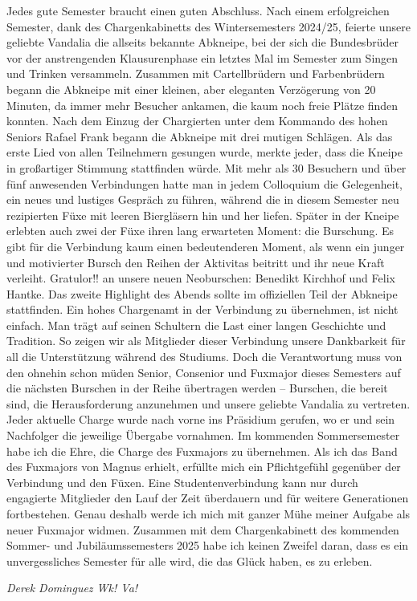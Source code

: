 \begin{multicols}{2}
Jedes gute Semester braucht einen guten Abschluss.
Nach einem erfolgreichen Semester, dank des Chargenkabinetts des Wintersemesters 2024/25, feierte unsere geliebte Vandalia die allseits bekannte Abkneipe,
bei der sich die Bundesbrüder vor der anstrengenden Klausurenphase ein letztes Mal im Semester zum Singen und Trinken versammeln.
Zusammen mit Cartellbrüdern und Farbenbrüdern begann die Abkneipe mit einer kleinen, aber eleganten Verzögerung von 20 Minuten, da immer mehr Besucher ankamen,
die kaum noch freie Plätze finden konnten.
Nach dem Einzug der Chargierten unter dem Kommando des hohen Seniors Rafael Frank begann die Abkneipe mit drei mutigen Schlägen.
Als das erste Lied von allen Teilnehmern gesungen wurde, merkte jeder, dass die Kneipe in großartiger Stimmung stattfinden würde.
Mit mehr als 30 Besuchern und über fünf anwesenden Verbindungen hatte man in jedem Colloquium die Gelegenheit, ein neues und lustiges Gespräch zu führen,
während die in diesem Semester neu rezipierten Füxe mit leeren Biergläsern hin und her liefen.
Später in der Kneipe erlebten auch zwei der Füxe ihren lang erwarteten Moment: die Burschung.
Es gibt für die Verbindung kaum einen bedeutenderen Moment, als wenn ein junger und motivierter Bursch den Reihen der Aktivitas beitritt und ihr neue Kraft verleiht.
Gratulor!! an unsere neuen Neoburschen: Benedikt Kirchhof und Felix Hantke.
Das zweite Highlight des Abends sollte im offiziellen Teil der Abkneipe stattfinden.
Ein hohes Chargenamt in der Verbindung zu übernehmen, ist nicht einfach.
Man trägt auf seinen Schultern die Last einer langen Geschichte und Tradition.
So zeigen wir als Mitglieder dieser Verbindung unsere Dankbarkeit für all die Unterstützung während des Studiums.
Doch die Verantwortung muss von den ohnehin schon müden Senior, Consenior und Fuxmajor dieses Semesters auf die nächsten Burschen in der Reihe übertragen werden – Burschen,
die bereit sind, die Herausforderung anzunehmen und unsere geliebte Vandalia zu vertreten.
Jeder aktuelle Charge wurde nach vorne ins Präsidium gerufen, wo er und sein Nachfolger die jeweilige Übergabe vornahmen.
Im kommenden Sommersemester habe ich die Ehre, die Charge des Fuxmajors zu übernehmen.
Als ich das Band des Fuxmajors von Magnus erhielt, erfüllte mich ein Pflichtgefühl gegenüber der Verbindung und den Füxen.
Eine Studentenverbindung kann nur durch engagierte Mitglieder den Lauf der Zeit überdauern und für weitere Generationen fortbestehen.
Genau deshalb werde ich mich mit ganzer Mühe meiner Aufgabe als neuer Fuxmajor widmen.
Zusammen mit dem Chargenkabinett des kommenden Sommer- und Jubiläumssemesters 2025 habe ich keinen Zweifel daran, dass es ein unvergessliches Semester für alle wird,
die das Glück haben, es zu erleben.




	\begin{flushright}
		\hfill\emph{Derek Dominguez Wk! Va!}
	\end{flushright}
\end{multicols}
